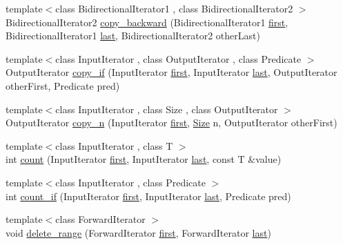 \begin{DoxyCompactItemize}
\item 
{\footnotesize template$<$class Bidirectional\+Iterator1 , class Bidirectional\+Iterator2 $>$ }\\Bidirectional\+Iterator2 \hyperlink{namespaceprism_a2564c63b76369cc81ff725a56e818046}{copy\+\_\+backward} (Bidirectional\+Iterator1 \hyperlink{namespaceprism_ae3fb7a1926a9e8e59300cd5e370470da}{first}, Bidirectional\+Iterator1 \hyperlink{namespaceprism_abe4956c4e865f55ca126b7fb973b5078}{last}, Bidirectional\+Iterator2 other\+Last)
\item 
{\footnotesize template$<$class Input\+Iterator , class Output\+Iterator , class Predicate $>$ }\\Output\+Iterator \hyperlink{namespaceprism_afbed55ae6769c2d88c125aedc2f3846e}{copy\+\_\+if} (Input\+Iterator \hyperlink{namespaceprism_ae3fb7a1926a9e8e59300cd5e370470da}{first}, Input\+Iterator \hyperlink{namespaceprism_abe4956c4e865f55ca126b7fb973b5078}{last}, Output\+Iterator other\+First, Predicate pred)
\item 
{\footnotesize template$<$class Input\+Iterator , class Size , class Output\+Iterator $>$ }\\Output\+Iterator \hyperlink{namespaceprism_af907f3f5637d4ec056e9b833b6272953}{copy\+\_\+n} (Input\+Iterator \hyperlink{namespaceprism_ae3fb7a1926a9e8e59300cd5e370470da}{first}, \hyperlink{classprism_1_1_size}{Size} n, Output\+Iterator other\+First)
\item 
{\footnotesize template$<$class Input\+Iterator , class T $>$ }\\int \hyperlink{namespaceprism_a024117fc3639cdf6598509edf22f034a}{count} (Input\+Iterator \hyperlink{namespaceprism_ae3fb7a1926a9e8e59300cd5e370470da}{first}, Input\+Iterator \hyperlink{namespaceprism_abe4956c4e865f55ca126b7fb973b5078}{last}, const T \&value)
\item 
{\footnotesize template$<$class Input\+Iterator , class Predicate $>$ }\\int \hyperlink{namespaceprism_af0007d361beae18a930b6249752e509e}{count\+\_\+if} (Input\+Iterator \hyperlink{namespaceprism_ae3fb7a1926a9e8e59300cd5e370470da}{first}, Input\+Iterator \hyperlink{namespaceprism_abe4956c4e865f55ca126b7fb973b5078}{last}, Predicate pred)
\item 
{\footnotesize template$<$class Forward\+Iterator $>$ }\\void \hyperlink{namespaceprism_a83e62e5b148c55f949e5ea843d53ad67}{delete\+\_\+range} (Forward\+Iterator \hyperlink{namespaceprism_ae3fb7a1926a9e8e59300cd5e370470da}{first}, Forward\+Iterator \hyperlink{namespaceprism_abe4956c4e865f55ca126b7fb973b5078}{last})

\end{DoxyCompactItemize}
